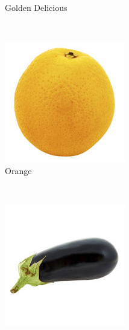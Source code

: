 \begin{figure}[t]
\begin{minipage}[b]{0.47\textwidth}
\begin{subfigure}[t]{0.32\textwidth}
			\caption{Golden Delicious}
			\label{subfig:clean-image-c}
		\end{subfigure}~
		\begin{subfigure}[t]{0.32\textwidth}
			\centering
			\includegraphics[width=\textwidth]{PaperA/clean-image-figure/Orange_Clean.jpg}
			\caption{Orange}
			\label{subfig:clean-image-f}
		\end{subfigure}~ \\[1mm]
		\begin{subfigure}[t]{0.32\textwidth}
			\centering
			\includegraphics[width=\textwidth]{PaperA/clean-image-figure/Aubergine_Clean.jpg}

\end{subfigure}
\end{minipage}
\end{figure}
